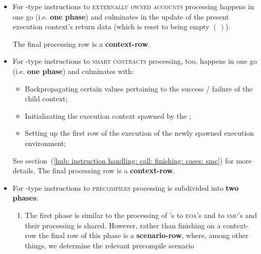 \begin{itemize}
	\item
		For -type instructions
		to \textsc{externally owned accounts}
		processing happens in one go (i.e. \textbf{one phase}) and culminates in the update of the present execution context's return data (which is reset to being empty $(\,)$).

		The final processing row is a \textbf{context-row}.
	\item
		For -type instructions
		to \textsc{smart contracts}
		processing, too, happens in one go (i.e. \textbf{one phase}) and culminates with:
		\begin{itemize}
			\item Backpropagating certain values pertaining to the success / failure of the child context;
			\item Initializating the execution context spawned by the ;
			\item Setting up the first row of the execution of the newly spawned execution environment;
		\end{itemize}
		See section~(\ref{hub: instruction handling: call: finishing: cases: smc}) for more details.
		The final processing row is a \textbf{context-row}.
	\item
		For -type instructions
		to \textsc{precompiles}
		processing is subdivided into \textbf{two phases}:
		\begin{enumerate}
		        \item
				The first phase is similar to the processing of 's to \textsc{eoa}'s and to \textsc{smc}'s and their processing is shared.
				However, rather than finishing on a context-row the final row of this phase is a \textbf{scenario-row}, where, among other things, we determine the relevant precompile scenario


\end{enumerate}
\end{itemize}
